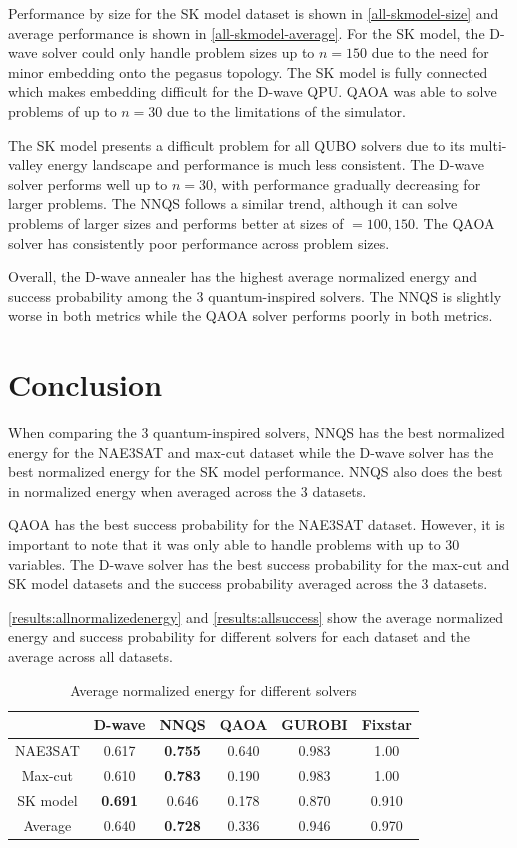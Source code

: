 Performance by size for the SK model dataset is shown in \autoref{all-skmodel-size} and average performance is shown in \autoref{all-skmodel-average}. For the SK model, the D-wave solver could only handle problem sizes up to $n=150$ due to the need for minor embedding onto the pegasus topology. The SK model is fully connected which makes embedding difficult for the D-wave QPU. QAOA was able to solve problems of up to $n=30$ due to the limitations of the simulator.

The SK model presents a difficult problem for all QUBO solvers due to its multi-valley energy landscape and performance is much less consistent. The D-wave solver performs well up to $n=30$, with performance gradually decreasing for larger problems. The NNQS follows a similar trend, although it can solve problems of larger sizes and performs better at sizes of $=100,150$. The QAOA solver has consistently poor performance across problem sizes.

Overall, the D-wave annealer has the highest average normalized energy and success probability among the 3 quantum-inspired solvers. The NNQS is slightly worse in both metrics while the QAOA solver performs poorly in both metrics.

\section{Conclusion}
When comparing the 3 quantum-inspired solvers, NNQS has the best normalized energy for the NAE3SAT and max-cut dataset while the D-wave solver has the best normalized energy for the SK model performance. NNQS also does the best in normalized energy when averaged across the 3 datasets. 

QAOA has the best success probability for the NAE3SAT dataset. However, it is important to note that it was only able to handle problems with up to $30$ variables. The D-wave solver has the best success probability for the max-cut and SK model datasets and the success probability averaged across the 3 datasets.

\autoref{results:allnormalizedenergy} and \autoref{results:allsuccess} show the average normalized energy and success probability for different solvers for each dataset and the average across all datasets.


\begin{table}[!ht]
    \centering
    \begin{tabular}{cccccc} \toprule
        ~ & D-wave & NNQS & QAOA & GUROBI & Fixstar \\ \midrule
        NAE3SAT & 0.617 & \textbf{0.755} & 0.640 & 0.983 & 1.00 \\
        Max-cut & 0.610 & \textbf{0.783} & 0.190 & 0.983 & 1.00 \\
        SK model & \textbf{0.691} & 0.646 & 0.178 & 0.870 & 0.910 \\ \midrule
        Average & 0.640 & \textbf{0.728} & 0.336 & 0.946 & 0.970 \\ \bottomrule
    \end{tabular}
    \caption{Average normalized energy for different solvers}
    \label{results:allnormalizedenergy}
\end{table}

